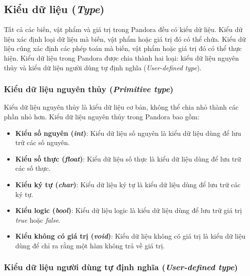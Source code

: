 \subsection{Kiểu dữ liệu (\textit{Type})}

\regexty

Tất cả các biến, vật phẩm và giá trị trong Pandora đều có kiểu dữ liệu. Kiểu dữ liệu xác định loại dữ liệu mà biến, vật phẩm hoặc giá trị đó có thể chứa. Kiểu dữ liệu cũng xác định các phép toán mà biến, vật phẩm hoặc giá trị đó có thể thực hiện. Kiểu dữ liệu trong Pandora được chia thành hai loại: kiểu dữ liệu nguyên thủy và kiểu dữ liệu người dùng tự định nghĩa (\textit{User-defined type}).

\subsubsection{Kiểu dữ liệu nguyên thủy (\textit{Primitive type})}

Kiểu dữ liệu nguyên thủy là kiểu dữ liệu cơ bản, không thể chia nhỏ thành các phần nhỏ hơn. Kiểu dữ liệu nguyên thủy trong Pandora bao gồm:

\begin{itemize}
    \item \textbf{Kiểu số nguyên (\textit{int})}: Kiểu dữ liệu số nguyên là kiểu dữ liệu dùng để lưu trữ các số nguyên.
    
    \item \textbf{Kiểu số thực (\textit{float})}: Kiểu dữ liệu số thực là kiểu dữ liệu dùng để lưu trữ các số thực.

    \item \textbf{Kiểu ký tự (\textit{char})}: Kiểu dữ liệu ký tự là kiểu dữ liệu dùng để lưu trữ các ký tự.

    \item \textbf{Kiểu logic (\textit{bool})}: Kiểu dữ liệu logic là kiểu dữ liệu dùng để lưu trữ giá trị \textit{true} hoặc \textit{false}.

    \item \textbf{Kiểu không có giá trị (\textit{void})}: Kiểu dữ liệu không có giá trị là kiểu dữ liệu dùng để chỉ ra rằng một hàm không trả về giá trị.
\end{itemize}

\subsubsection{Kiểu dữ liệu người dùng tự định nghĩa (\textit{User-defined type})}

